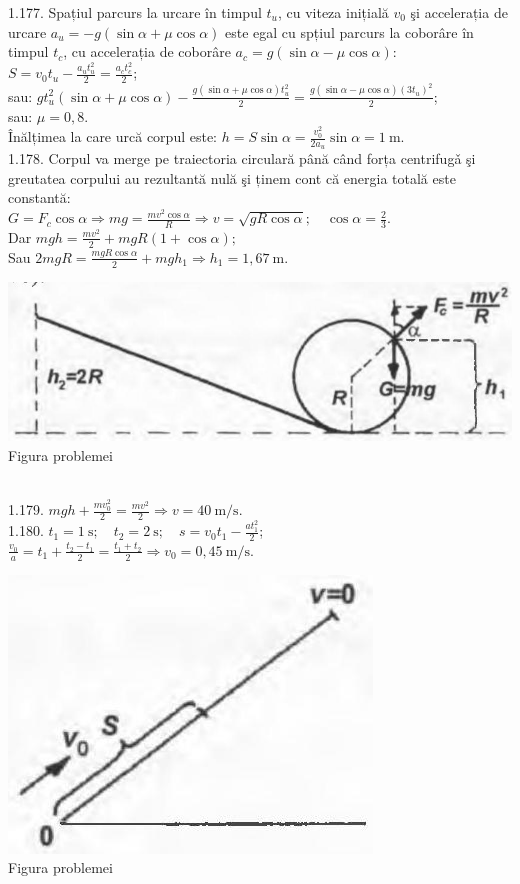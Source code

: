 1.177. Spațiul parcurs la urcare în timpul $t_{u}$, cu viteza inițială $v_{0}$ şi accelerația de urcare $a_{u}=-g(\sin \alpha+\mu \cos \alpha)$ este egal cu spțiul parcurs la coborâre în timpul $t_{c}$, cu accelerația de coborâre $a_{c}=g(\sin \alpha-\mu \cos \alpha)$:\\ $S=v_{0} t_{u}-\frac{a_{u} t_{u}^{2}}{2}=\frac{a_{c} t_{c}^{2}}{2}$;\\ sau: $g t_{u}^{2}(\sin \alpha+\mu \cos \alpha)-\frac{g(\sin \alpha+\mu \cos \alpha) t_{u}^{2}}{2}=\frac{g(\sin \alpha-\mu \cos \alpha)\left(3 t_{u}\right)^{2}}{2}$;\\ sau: $\mu=0,8$.\\ Înălțimea la care urcă corpul este: $h=S \sin \alpha=\frac{v_{0}^{2}}{2 a_{u}} \sin \alpha=1 \mathrm{~m}$.\\

1.178. Corpul va merge pe traiectoria circulară până când forța centrifugǎ şi greutatea corpului au rezultantă nulă şi ținem cont că energia totală este constantă:\\ $G=F_{c} \cos \alpha \Rightarrow m g=\frac{m v^{2} \cos \alpha}{R} \Rightarrow v=\sqrt{g R \cos \alpha}; \quad \cos \alpha=\frac{2}{3}$.\\ Dar $m g h=\frac{m v^{2}}{2}+m g R(1+\cos \alpha);$\\ Sau $2 m g R=\frac{m g R \cos \alpha}{2}+m g h_{1} \Rightarrow h_{1}=1,67 \mathrm{~m}$.\\ \begin{center} \includegraphics[width=0.4\linewidth]{images/2025_07_01_5b3ff9fa0d508c8e9f17g-238}\\ Figura problemei \end{center}\\

1.179. $m g h+\frac{m v_{0}^{2}}{2}=\frac{m v^{2}}{2} \Rightarrow v=40 \mathrm{~m} / \mathrm{s}$.\\

1.180. $t_{1}=1 \mathrm{~s}; \quad t_{2}=2 \mathrm{~s}; \quad s=v_{0} t_{1}-\frac{a t_{1}^{2}}{2}$;\\ $\frac{v_{0}}{a}=t_{1}+\frac{t_{2}-t_{1}}{2}=\frac{t_{1}+t_{2}}{2} \Rightarrow v_{0}=0,45 \mathrm{~m} / \mathrm{s}$.\\ \begin{center} \includegraphics[width=0.4\linewidth]{images/2025_07_01_5b3ff9fa0d508c8e9f17g-239}\\ Figura problemei \end{center}\\

